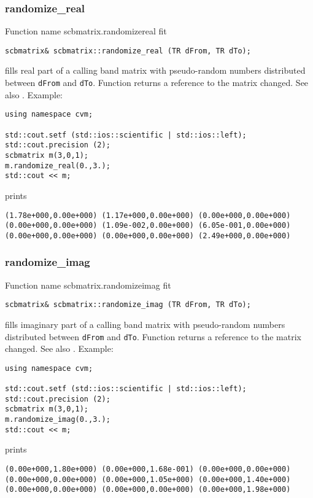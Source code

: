 \subsubsection{randomize\_real}
Function%
\pdfdest name {scbmatrix.randomizereal} fit
\begin{verbatim}
scbmatrix& scbmatrix::randomize_real (TR dFrom, TR dTo);
\end{verbatim}
fills  real part of a calling band matrix with 
pseudo-random numbers distributed between
\verb"dFrom" and \verb"dTo".
Function
returns a reference to the matrix changed.
See also
.
Example:
\begin{Verbatim}
using namespace cvm;

std::cout.setf (std::ios::scientific | std::ios::left); 
std::cout.precision (2);
scbmatrix m(3,0,1);
m.randomize_real(0.,3.);
std::cout << m;
\end{Verbatim}
prints
\begin{Verbatim}
(1.78e+000,0.00e+000) (1.17e+000,0.00e+000) (0.00e+000,0.00e+000)
(0.00e+000,0.00e+000) (1.09e-002,0.00e+000) (6.05e-001,0.00e+000)
(0.00e+000,0.00e+000) (0.00e+000,0.00e+000) (2.49e+000,0.00e+000)
\end{Verbatim}
\newpage


\subsubsection{randomize\_imag}
Function%
\pdfdest name {scbmatrix.randomizeimag} fit
\begin{verbatim}
scbmatrix& scbmatrix::randomize_imag (TR dFrom, TR dTo);
\end{verbatim}
fills  imaginary part of a calling band matrix with 
pseudo-random numbers distributed between
\verb"dFrom" and \verb"dTo".
Function
returns a reference to the matrix changed.
See also
.
Example:
\begin{Verbatim}
using namespace cvm;

std::cout.setf (std::ios::scientific | std::ios::left);
std::cout.precision (2);
scbmatrix m(3,0,1);
m.randomize_imag(0.,3.);
std::cout << m;
\end{Verbatim}
prints
\begin{Verbatim}
(0.00e+000,1.80e+000) (0.00e+000,1.68e-001) (0.00e+000,0.00e+000)
(0.00e+000,0.00e+000) (0.00e+000,1.05e+000) (0.00e+000,1.40e+000)
(0.00e+000,0.00e+000) (0.00e+000,0.00e+000) (0.00e+000,1.98e+000)
\end{Verbatim}
\newpage


